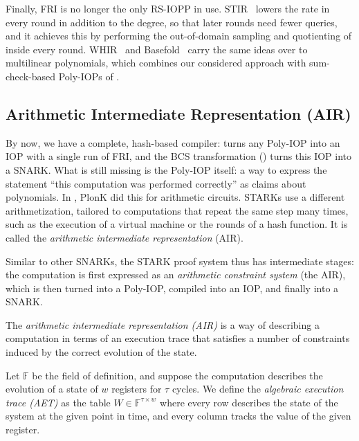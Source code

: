\documentclass[../../book]{subfiles}
\begin{document}
Finally, FRI is no longer the only RS-IOPP in use.
STIR~\cite{C:ACFY24}
lowers the rate in every round in addition to the degree, so that later rounds need fewer queries, and it achieves this by performing the out-of-domain sampling and quotienting of  inside every round.
WHIR~\cite{EC:ACFY25}
and Basefold~\cite{C:ZeiCheFis24}
carry the same ideas over to multilinear polynomials, which combines our considered approach with sum-check-based Poly-IOPs of .

\subsection{Arithmetic Intermediate Representation (AIR)}\label{subsec:air}

By now, we have a complete, hash-based compiler:  turns any Poly-IOP into an IOP with a single run of FRI, and the BCS transformation () turns this IOP into a SNARK.
What is still missing is the Poly-IOP itself: a way to express the statement ``this computation was performed correctly'' as claims about polynomials.
In , PlonK did this for arithmetic circuits.
STARKs use a different arithmetization, tailored to computations that repeat the same step many times, such as the execution of a virtual machine or the rounds of a hash function.
It is called the \emph{arithmetic intermediate representation} (AIR).

Similar to other SNARKs, the STARK proof system thus has intermediate stages: the computation is first expressed as an \emph{arithmetic constraint system} (the AIR), which is then turned into a Poly-IOP, compiled into an IOP, and finally into a SNARK.

\begin{definition}\label{def:air}
  The \emph{arithmetic intermediate representation (AIR)} is a way of describing a computation in terms of an execution trace that satisfies a number of constraints induced by the correct evolution of the state.
\end{definition}

\begin{definition}\label{def:aet}
  Let $\mathbb{F}$ be the field of definition, and suppose the computation describes the evolution of a state of $w$ registers for $\tau$ cycles.
  We define the \emph{algebraic execution trace (AET)} as the table $W \in \mathbb{F}^{\tau \times w}$ where every row describes the state of the system at the given point in time, and every column tracks the value of the given register.
\end{definition}
\end{document}
